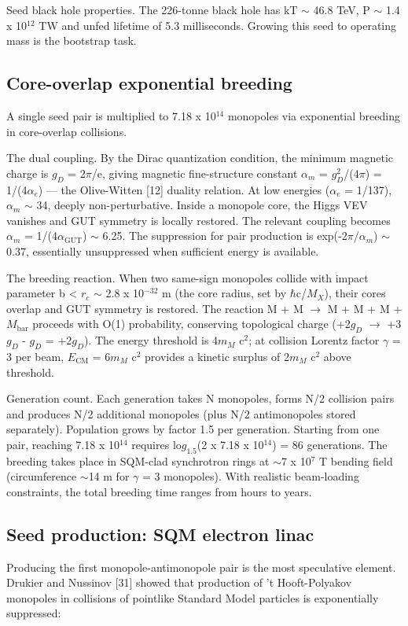 \documentclass[12pt,a4paper]{article}
\begin{document}
Seed black hole properties. The 226-tonne black hole has kT $\sim$ 46.8 TeV, P $\sim$ 1.4 x 10$^{12}$ TW and unfed lifetime of 5.3 milliseconds. Growing this seed to operating mass is the bootstrap task.

\subsection{Core-overlap exponential breeding}
A single seed pair is multiplied to 7.18 x 10$^{14}$ monopoles via exponential breeding in core-overlap collisions.

The dual coupling. By the Dirac quantization condition, the minimum magnetic charge is $g_D$ = 2$\pi$/e, giving magnetic fine-structure constant $\alpha_m$ = $g_D ^{2}$/(4$\pi$) = 1/(4$\alpha_e$) --- the Olive-Witten [12] duality relation. At low energies ($\alpha_e$ = 1/137), $\alpha_m$ $\sim$ 34, deeply non-perturbative. Inside a monopole core, the Higgs VEV vanishes and GUT symmetry is locally restored. The relevant coupling becomes $\alpha_m$ = 1/(4$\alpha_{\text{GUT}}$) $\sim$ 6.25. The suppression for pair production is exp(-2$\pi$/$\alpha_m$) $\sim$ 0.37, essentially unsuppressed when sufficient energy is available.

The breeding reaction. When two same-sign monopoles collide with impact parameter b < $r_c$ $\sim$ 2.8 x 10$^{-32}$ m (the core radius, set by $\hbar$c/$M_X$), their cores overlap and GUT symmetry is restored. The reaction M + M $\to$ M + M + M + $M_{\text{bar}}$ proceeds with O(1) probability, conserving topological charge (+2$g_D$ $\to$ +3$g_D$ - $g_D$ = +2$g_D$). The energy threshold is 4$m_M$ c$^{2}$; at collision Lorentz factor $\gamma$ = 3 per beam, $E_{\text{CM}}$ = 6$m_M$ c$^{2}$ provides a kinetic surplus of 2$m_M$ c$^{2}$ above threshold.

Generation count. Each generation takes N monopoles, forms N/2 collision pairs and produces N/2 additional monopoles (plus N/2 antimonopoles stored separately). Population grows by factor 1.5 per generation. Starting from one pair, reaching 7.18 x 10$^{14}$ requires lo$g_{1.5}$(2 x 7.18 x 10$^{14}$) = 86 generations. The breeding takes place in SQM-clad synchrotron rings at $\sim$7 x 10$^{7}$ T bending field (circumference $\sim$14 m for $\gamma$ = 3 monopoles). With realistic beam-loading constraints, the total breeding time ranges from hours to years.

\subsection{Seed production: SQM electron linac}
Producing the first monopole-antimonopole pair is the most speculative element. Drukier and Nussinov [31] showed that production of 't Hooft-Polyakov monopoles in collisions of pointlike Standard Model particles is exponentially suppressed:
\end{document}
